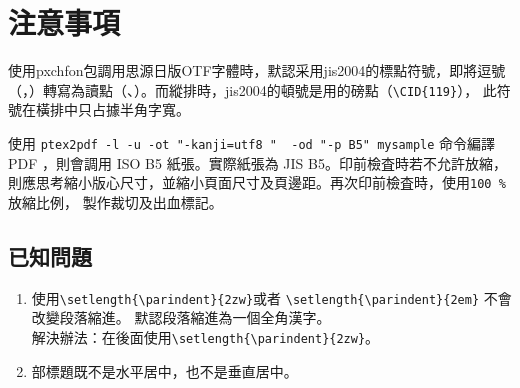 \section{注意事項}

\par 使用pxchfon包調用思源日版OTF字體時，默認采用jis2004的標點符號，即將逗號%
（，）轉寫為讀點（、）。而縱排時，jis2004的頓號是用的磅點（\verb+\CID{119}+），
此符號在橫排中只占據半角字寬。

\vspace{5mm}
\par 使用 {\color{red}\verb+ptex2pdf -l -u -ot "-kanji=utf8 "  -od "-p B5" mysample+}
 命令編譯 PDF ，則會調用 ISO B5 紙張。實際紙張為 JIS B5。印前檢査時若不允許放縮，
 則應思考縮小版心尺寸，並縮小頁面尺寸及頁邊距。再次印前檢査時，使用{\color{red}\verb+100 % +} 放縮比例，
 製作裁切及出血標記。

\subsection{已知問題}

\begin{enumerate}
\item 使用{\color{red}\verb+\setlength{\parindent}{2zw}+}或者
{\color{red}\verb+\setlength{\parindent}{2em}+} 不會改變段落縮進。
默認段落縮進為一個全角漢字。\\
解決辦法：在\verb++後面使用{\color{red}\verb+\setlength{\parindent}{2zw}+}。
\item 部標題既不是水平居中，也不是垂直居中。
\end{enumerate}

